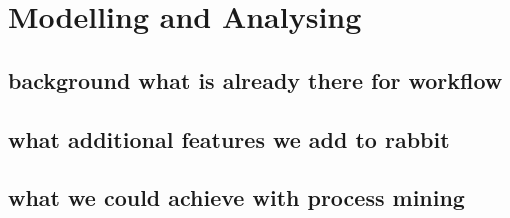 \chapter{Modelling and Analysing}\label{sec:the operating system}
\section{background what is already there for workflow}
\section{what additional features we add to rabbit}
\section{what we could achieve with process mining}

